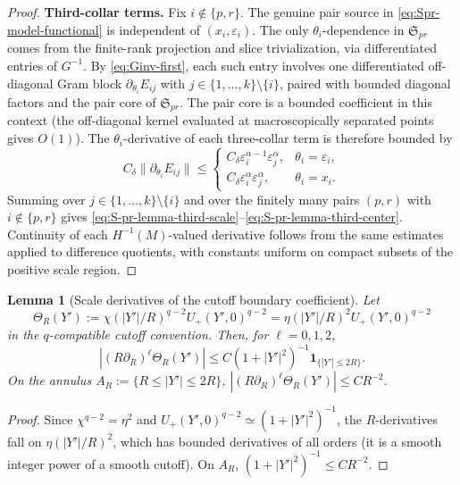 \documentclass[11pt,reqno,a4paper]{amsart}
\numberwithin{equation}{section}
\theoremstyle{plain}
\newtheorem{lemma}[theorem]{Lemma}
\theoremstyle{remark}
\theoremstyle{plain}
\begin{document}
\begin{proof}
\smallskip\noindent
\textbf{Third-collar terms.}
Fix $i\notin\{p,r\}$.  The genuine pair source in \eqref{eq:Spr-model-functional} is independent of
$(x_i,\varepsilon_i)$.  The only $\theta_i$-dependence in $\mathfrak S_{pr}$ comes from the finite-rank
projection and slice trivialization, via differentiated entries of $G^{-1}$.  By \eqref{eq:Ginv-first}, each
such entry involves one differentiated off-diagonal Gram block $\partial_{\theta_i}E_{ij}$ with
$j\in\{1,\dots,k\}\setminus\{i\}$, paired with bounded diagonal factors and the pair core of
$\mathfrak S_{pr}$.  The pair core is a bounded coefficient in this context (the off-diagonal kernel evaluated
at macroscopically separated points gives $O(1)$).  The $\theta_i$-derivative of each three-collar term is
therefore bounded by
\[
C_\delta\|\partial_{\theta_i}E_{ij}\|
\le
\begin{cases}
C_\delta\varepsilon_i^{\alpha-1}\varepsilon_j^\alpha,
&\theta_i=\varepsilon_i,\\
C_\delta\varepsilon_i^\alpha\varepsilon_j^\alpha,
&\theta_i=x_i.
\end{cases}
\]
Summing over $j\in\{1,\dots,k\}\setminus\{i\}$ and over the finitely many pairs $(p,r)$ with $i\notin\{p,r\}$
gives \eqref{eq:S-pr-lemma-third-scale}--\eqref{eq:S-pr-lemma-third-center}.
Continuity of each $H^{-1}(M)$-valued derivative follows from the same estimates applied to difference
quotients, with constants uniform on compact subsets of the positive scale region.
\end{proof}


\begin{lemma}[Scale derivatives of the cutoff boundary coefficient]
\label{lem:q-compatible-coefficient}
Let $$\Theta_R(Y'):=\chi(|Y'|/R)^{q-2}U_+(Y',0)^{q-2}=\eta(|Y'|/R)^2U_+(Y',0)^{q-2}$$
in the $q$-compatible cutoff convention.  Then, for $\ell=0,1,2$,
\begin{equation}\label{eq:theta-log-derivative-bound}
\left|(R\partial_R)^\ell\Theta_R(Y')\right|
\le C(1+|Y'|^2)^{-1}\mathbf 1_{\{|Y'|\le2R\}}.
\end{equation}
On the annulus $A_R:=\{R\le|Y'|\le2R\}$,
$|(R\partial_R)^\ell\Theta_R(Y')|\le CR^{-2}$.
\end{lemma}

\begin{proof}
Since $\chi^{q-2}=\eta^2$ and $U_+(Y',0)^{q-2}\simeq(1+|Y'|^2)^{-1}$,
the $R$-derivatives fall on $\eta(|Y'|/R)^2$, which has bounded derivatives
of all orders (it is a smooth integer power of a smooth cutoff).
On $A_R$, $(1+|Y'|^2)^{-1}\le CR^{-2}$.
\end{proof}
\end{document}
